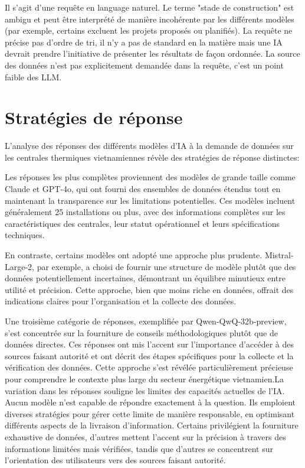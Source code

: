 \documentclass[a4paper,11pt]{report}
\begin{document}
Il s'agit d'une requête en language naturel. Le terme "stade de construction" est ambigu et peut être interprété de manière incohérente par les différents modèles (par exemple, certains excluent les projets proposés ou planifiés). La requête ne précise pas d'ordre de tri, il n'y a pas de standard en la matière mais une IA devrait prendre l'initiative de présenter les résultats de façon ordonnée. La source des données n'est pas explicitement demandée dans la requête, c'est un point faible des LLM.

\section{Stratégies de réponse}\label{stratuxe9gies-de-ruxe9ponse}

L'analyse des réponses des différents modèles d'IA à la demande de données sur les centrales thermiques vietnamiennes révèle des stratégies de réponse distinctes:

Les réponses les plus complètes proviennent des modèles de grande taille comme Claude et GPT-4o, qui ont fourni des ensembles de données étendus tout en maintenant la transparence sur les limitations potentielles. Ces modèles incluent généralement 25 installations ou plus, avec des informations complètes sur les caractéristiques des centrales, leur statut opérationnel et leurs spécifications techniques.

En contraste, certains modèles ont adopté une approche plus prudente. Mistral-Large-2, par exemple, a choisi de fournir une structure de modèle plutôt que des données potentiellement incertaines, démontrant un équilibre minutieux entre utilité et précision. Cette approche, bien que moins riche en données, offrait des indications claires pour l'organisation et la collecte des données.

Une troisième catégorie de réponses, exemplifiée par Qwen-QwQ-32b-preview, s'est concentrée sur la fourniture de conseils méthodologiques plutôt que de données directes. Ces réponses ont mis l'accent sur l'importance d'accéder à des sources faisant autorité et ont décrit des étapes spécifiques pour la collecte et la vérification des données. Cette approche s'est révélée particulièrement précieuse pour comprendre le contexte plus large du secteur énergétique vietnamien.La variation dans les réponses souligne les limites des capacités actuelles de l'IA. Aucun modèle n'est capable de répondre exactement à la question. Ils emploient diverses stratégies pour gérer cette limite de manière responsable, en optimisant différents aspects de la livraison d'information. Certains privilégient la fourniture exhaustive de données, d'autres mettent l'accent sur la précision à travers des informations limitées mais vérifiées, tandis que d'autres se concentrent sur l'orientation des utilisateurs vers des sources faisant autorité.
\end{document}
